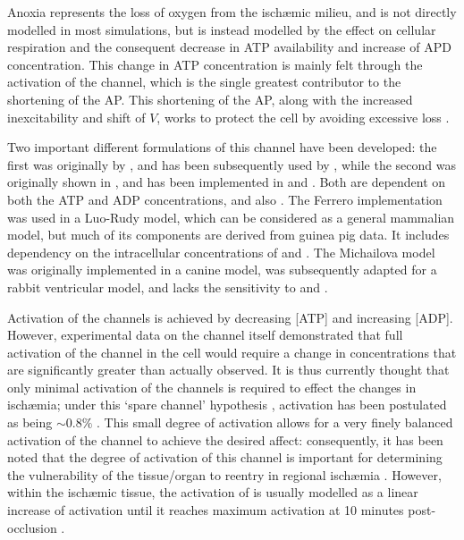 \documentclass[../thesis-main.tex]{subfiles}
\begin{document}
Anoxia represents the loss of oxygen from the isch\ae{}mic milieu, and is not directly modelled in most simulations, but is instead modelled by the effect on cellular respiration and the consequent decrease in ATP availability and increase of APD concentration. This change in ATP concentration is mainly felt through the activation of the \ikatp{} channel, which is the single greatest contributor to the shortening of the AP. This shortening of the AP, along with the increased inexcitability and shift of $V$, works to protect the cell by avoiding excessive \K{} loss \citep{Carmeliet1999}.

Two important different formulations of this channel have been developed: the first was originally by \citet{Ferrero1996}, and has been subsequently used by \citet{Trenor2007}, while the second was originally shown in \citet{Michailova2005}, and has been implemented in \citet{Terkildsen2007} and \citet{Michailova2007}. Both are dependent on both the ATP and ADP concentrations, and also \ko{}. The Ferrero implementation was used in a Luo-Rudy model, which can be considered as a general mammalian model, but much of its components are derived from guinea pig data. It includes dependency on the intracellular concentrations of \na{} and \mg{}. The Michailova model was originally implemented in a canine model, was subsequently adapted for a rabbit ventricular model, and lacks the sensitivity to \na{} and \mg{}.

Activation of the \ikatp{} channels is achieved by decreasing [ATP] and increasing [ADP]. However, experimental data on the channel itself demonstrated that full activation of the channel in the cell would require a change in concentrations that are significantly greater than actually observed. It is thus currently thought that only minimal activation of the \ikatp{} channels is required to effect the changes in isch\ae{}mia; under this `spare channel' hypothesis \citep{Cook1988}, activation has been postulated as being $\sim0.8\%$ \citep{Rodriguez2002, Weiss1992, Ferrero1996, Trenor2007, Ferrero2003}. This small degree of activation allows for a very finely balanced activation of the channel to achieve the desired affect: consequently, it has been noted that the degree of activation of this channel is important for determining the vulnerability of the tissue/organ to reentry in regional isch\ae{}mia \citep{Ferrero2003a, Trenor2005}. However, within the isch\ae{}mic tissue, the activation of \ikatp{} is usually modelled as a linear increase of activation until it reaches maximum activation at 10 minutes post-occlusion \citep{Trenor2007, Tice2007}.
\end{document}
